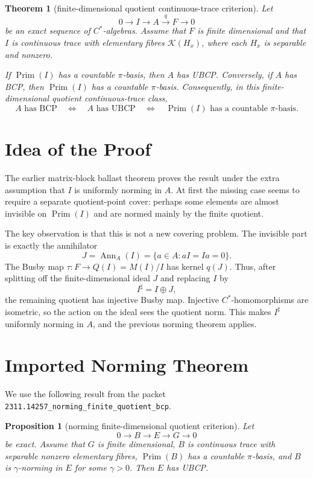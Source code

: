 \documentclass[11pt]{article}
\newtheorem{theorem}{Theorem}
\newtheorem{proposition}{Proposition}
\newcommand{\Kcal}{\mathcal K}
\newcommand{\Prim}{\operatorname{Prim}}
\newcommand{\Ann}{\operatorname{Ann}}
\begin{document}
\begin{theorem}[finite-dimensional quotient continuous-trace criterion]
\label{thm:main}
Let
\[
        0\longrightarrow I\longrightarrow A
        \stackrel{q}{\longrightarrow} F\longrightarrow0
\]
be an exact sequence of \(C^*\)-algebras.  Assume that \(F\) is finite
dimensional and that \(I\) is continuous trace with elementary fibres
\(\Kcal(H_x)\), where each \(H_x\) is separable and nonzero.

If \(\Prim(I)\) has a countable \(\pi\)-basis, then \(A\) has UBCP.
Conversely, if \(A\) has BCP, then \(\Prim(I)\) has a countable \(\pi\)-basis.
Consequently, in this finite-dimensional quotient continuous-trace class,
\[
        A\text{ has BCP}
        \quad\Longleftrightarrow\quad
        A\text{ has UBCP}
        \quad\Longleftrightarrow\quad
        \Prim(I)\text{ has a countable }\pi\text{-basis}.
\]
\end{theorem}

\section*{Idea of the Proof}

The earlier matrix-block ballast theorem proves the result under the extra
assumption that \(I\) is uniformly norming in \(A\).  At first the missing case
seems to require a separate quotient-point cover: perhaps some elements are
almost invisible on \(\Prim(I)\) and are normed mainly by the finite quotient.

The key observation is that this is not a new covering problem.  The invisible
part is exactly the annihilator
\[
        J=\Ann_A(I)=\{a\in A:aI=Ia=0\}.
\]
The Busby map \(\tau:F\to Q(I)=M(I)/I\) has kernel \(q(J)\).  Thus, after
splitting off the finite-dimensional ideal \(J\) and replacing \(I\) by
\[
        I^\sharp=I\oplus J,
\]
the remaining quotient has injective Busby map.  Injective \(C^*\)-homomorphisms
are isometric, so the action on the ideal sees the quotient norm.  This makes
\(I^\sharp\) uniformly norming in \(A\), and the previous norming theorem
applies.

\section*{Imported Norming Theorem}

We use the following result from the packet
\texttt{2311.14257\_norming\_finite\_quotient\_bcp}.

\begin{proposition}[norming finite-dimensional quotient criterion]
\label{prop:norming}
Let
\[
        0\longrightarrow B\longrightarrow E\longrightarrow G\longrightarrow0
\]
be exact.  Assume that \(G\) is finite dimensional, \(B\) is continuous trace
with separable nonzero elementary fibres, \(\Prim(B)\) has a countable
\(\pi\)-basis, and \(B\) is \(\gamma\)-norming in \(E\) for some
\(\gamma>0\).  Then \(E\) has UBCP.
\end{proposition}
\end{document}
